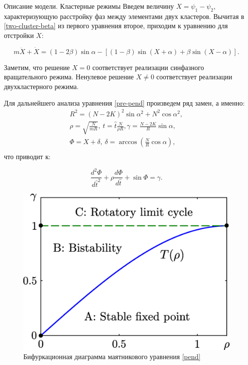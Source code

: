 \begin{chapter}{Описание модели. Кластерные режимы}
	Введем величину $X = \psi_1 - \psi_2$, характеризующую расстройку фаз между элементами двух кластеров.
	Вычитая в \eqref{two-cluster-beta} из первого уравнения второе, приходим к уравнению для отстройки $X$:

	\begin{equation} \label{pre-pend}
		m\ddot{X} + \dot{X} = (1 - 2 \beta) \sin{\alpha} - \left[(1-\beta)\sin{(X + \alpha)} + \beta\sin{(X - \alpha)} \right].
	\end{equation}
	
	Заметим, что решение $X = 0$ соответствует реализации
	синфазного вращательного режима. Ненулевое решение $X \neq 0$ соответствует
	реализации двухкластерного режима.
	
	
	Для дальнейшего анализа уравнения \eqref{pre-pend} произведем ряд замен, а именно:
	\begin{align*}
	R^2 = (N - 2K)^2 \sin{\alpha}^2 + N^2 \cos{\alpha}^2, \\
	\rho = \sqrt{\frac{N}{m R}}, \ t = \hat{t} \frac{N}{\rho R}, \gamma = \frac{N - 2K}{R}\sin{\alpha}, \\
	\Phi = X + \delta, \ \delta = \arccos{(\frac{N}{R}\cos{\alpha})}, \\
	\end{align*}
	что приводит к:
	
	\begin{equation} \label{pend}
		\frac{d^2 \Phi }{d\hat{t}^2} + \rho \frac{d\Phi}{d\hat{t}} + \sin{\Phi} = \gamma.
	\end{equation}

	\begin{figure}[h!]
		\begin{center}
			\includegraphics[width=0.7\columnwidth]{pictures/bf-tricommy.png}
		\end{center}
		\caption{Бифуркационная диаграмма маятникового уравнения \eqref{pend}}
		\label{bf-d}
	\end{figure}


\end{chapter}
